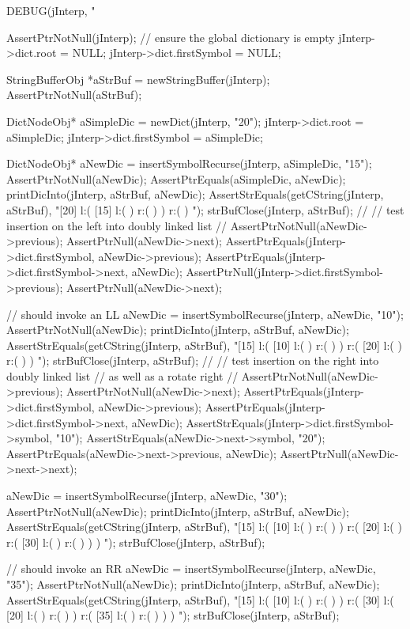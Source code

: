 \startCTest
  DEBUG(jInterp, "\n%

  AssertPtrNotNull(jInterp);
  // ensure the global dictionary is empty
  jInterp->dict.root        = NULL;
  jInterp->dict.firstSymbol = NULL;

  StringBufferObj *aStrBuf = newStringBuffer(jInterp);
  AssertPtrNotNull(aStrBuf);
  
  DictNodeObj* aSimpleDic = newDict(jInterp, "20");
  jInterp->dict.root        = aSimpleDic;
  jInterp->dict.firstSymbol = aSimpleDic;

  DictNodeObj* aNewDic = insertSymbolRecurse(jInterp, aSimpleDic, "15");
  AssertPtrNotNull(aNewDic);
  AssertPtrEquals(aSimpleDic, aNewDic);
  printDicInto(jInterp, aStrBuf, aNewDic);
  AssertStrEquals(getCString(jInterp, aStrBuf),
  "[20] l:( [15] l:(  ) r:(  )  ) r:(  ) ");
  strBufClose(jInterp, aStrBuf);
  //
  // test insertion on the left into doubly linked list
  //
  AssertPtrNotNull(aNewDic->previous);
  AssertPtrNull(aNewDic->next);
  AssertPtrEquals(jInterp->dict.firstSymbol, aNewDic->previous);
  AssertPtrEquals(jInterp->dict.firstSymbol->next, aNewDic);
  AssertPtrNull(jInterp->dict.firstSymbol->previous);
  AssertPtrNull(aNewDic->next);

  // should invoke an LL
  aNewDic = insertSymbolRecurse(jInterp, aNewDic, "10");
  AssertPtrNotNull(aNewDic);
  printDicInto(jInterp, aStrBuf, aNewDic);
  AssertStrEquals(getCString(jInterp, aStrBuf),
  "[15] l:( [10] l:(  ) r:(  )  ) r:( [20] l:(  ) r:(  )  ) ");
  strBufClose(jInterp, aStrBuf);
  //
  // test insertion on the right into doubly linked list
  // as well as a rotate right
  //
  AssertPtrNotNull(aNewDic->previous);
  AssertPtrNotNull(aNewDic->next);
  AssertPtrEquals(jInterp->dict.firstSymbol, aNewDic->previous);
  AssertPtrEquals(jInterp->dict.firstSymbol->next, aNewDic);
  AssertStrEquals(jInterp->dict.firstSymbol->symbol, "10");
  AssertStrEquals(aNewDic->next->symbol, "20");
  AssertPtrEquals(aNewDic->next->previous, aNewDic);
  AssertPtrNull(aNewDic->next->next);

  aNewDic = insertSymbolRecurse(jInterp, aNewDic, "30");
  AssertPtrNotNull(aNewDic);
  printDicInto(jInterp, aStrBuf, aNewDic);
  AssertStrEquals(getCString(jInterp, aStrBuf),
  "[15] l:( [10] l:(  ) r:(  )  ) r:( [20] l:(  ) r:( [30] l:(  ) r:(  )  )  ) ");
  strBufClose(jInterp, aStrBuf);
  
  // should invoke an RR
  aNewDic = insertSymbolRecurse(jInterp, aNewDic, "35");
  AssertPtrNotNull(aNewDic);
  printDicInto(jInterp, aStrBuf, aNewDic);
  AssertStrEquals(getCString(jInterp, aStrBuf),
  "[15] l:( [10] l:(  ) r:(  )  ) r:( [30] l:( [20] l:(  ) r:(  )  ) r:( [35] l:(  ) r:(  )  )  ) ");
  strBufClose(jInterp, aStrBuf);

